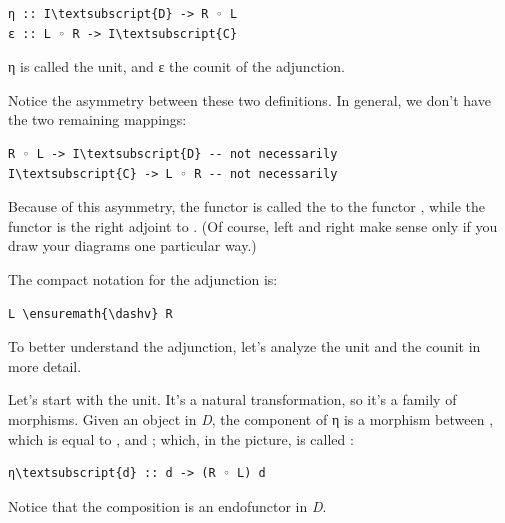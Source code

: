 \begin{Verbatim}[commandchars=\\\{\}]
η :: I\textsubscript{D} -> R ◦ L
ε :: L ◦ R -> I\textsubscript{C}
\end{Verbatim}
η is called the unit, and ε the counit of the adjunction.

Notice the asymmetry between these two definitions. In general, we don't
have the two remaining mappings:

\begin{Verbatim}[commandchars=\\\{\}]
R ◦ L -> I\textsubscript{D} -- not necessarily
I\textsubscript{C} -> L ◦ R -- not necessarily
\end{Verbatim}
Because of this asymmetry, the functor  is called the
 to the functor , while the functor
 is the right adjoint to . (Of course, left and
right make sense only if you draw your diagrams one particular way.)

The compact notation for the adjunction is:

\begin{Verbatim}[commandchars=\\\{\}]
L \ensuremath{\dashv} R
\end{Verbatim}
To better understand the adjunction, let's analyze the unit and the
counit in more detail.

\begin{figure}[H]
\centering
{}
\end{figure}

\noindent
Let's start with the unit. It's a natural transformation, so it's a
family of morphisms. Given an object  in \emph{D}, the
component of η is a morphism between , which is equal to
, and ; which, in the picture, is called
:

\begin{Verbatim}[commandchars=\\\{\}]
η\textsubscript{d} :: d -> (R ◦ L) d
\end{Verbatim}
Notice that the composition  is an endofunctor in \emph{D}.

